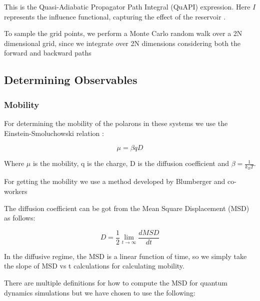 This is the Quasi-Adiabatic Propagator Path Integral (QuAPI) expression. Here $I$ represents the influence functional, capturing the effect of the reservoir \cite{feynman2000theory}. 

To sample the grid points, we perform a Monte Carlo random walk over a 2N dimensional grid, since we integrate over 2N dimensions considering both the forward and backward paths 



\subsection{Determining Observables}

\subsubsection{Mobility}

For determining the mobility of the polarons in these systems we use the Einstein-Smoluchowski relation : 

\begin{equation}
    \mu = \beta qD
\end{equation}

Where $\mu$ is the mobility, q is the charge, D is the diffusion coefficient and $\beta = \frac{1}{k_B T}$. 

For getting the mobility we use a method developed by Blumberger and co-workers \cite{blumberger} 

The diffusion coefficient can be got from the Mean Square Displacement (MSD) as follows: 

\begin{equation}
D = \frac{1}{2} \lim_{t \to \infty} \frac{dMSD}{dt}
\end{equation}

In the diffusive regime, the MSD is a linear function of time, so we simply take the slope of MSD vs t calculations for calculating mobility.

There are multiple definitions for how to compute the MSD for quantum dynamics simulations but we have chosen to use the following:

